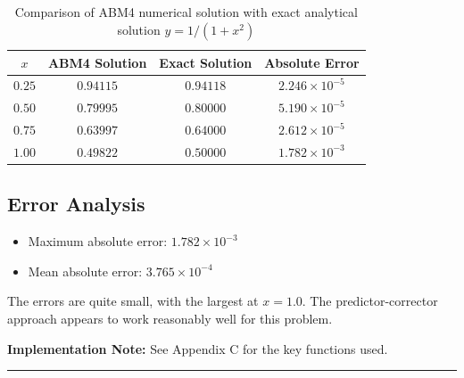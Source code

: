 \begin{table}[h]
\centering
\begin{tabular}{cccc}
\toprule
$x$ & ABM4 Solution & Exact Solution & Absolute Error \\
\midrule
$0.25$ & $0.94115$ & $0.94118$ & $2.246 \times 10^{-5}$ \\
$0.50$ & $0.79995$ & $0.80000$ & $5.190 \times 10^{-5}$ \\
$0.75$ & $0.63997$ & $0.64000$ & $2.612 \times 10^{-5}$ \\
$1.00$ & $0.49822$ & $0.50000$ & $1.782 \times 10^{-3}$ \\
\bottomrule
\end{tabular}
\caption{Comparison of ABM4 numerical solution with exact analytical solution $y = 1/(1+x^2)$}
\end{table}

\subsection*{Error Analysis}

\begin{itemize}
    \item Maximum absolute error: $1.782 \times 10^{-3}$
    \item Mean absolute error: $3.765 \times 10^{-4}$
\end{itemize}

The errors are quite small, with the largest at $x = 1.0$. The predictor-corrector approach appears to work reasonably well for this problem.

\textbf{Implementation Note:} See Appendix C for the key functions used.

\vspace{2em}
\noindent\rule{\textwidth}{0.4pt}
